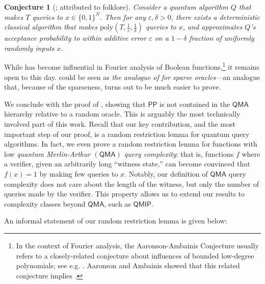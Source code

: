 \documentclass[10pt,a4paper]{article}
\newtheorem{conjecture}[theorem]{Conjecture}
\newcommand{\eps}{\varepsilon}
\newcommand{\poly}{\mathrm{poly}}
\begin{document}
\begin{conjecture}[{\cite[Conjecture 1.5]{AA14}; attributed to folklore}]
\label{conj:aaronson_ambainis}
Consider a quantum algorithm $Q$ that makes $T$ queries to $x \in \{0,1\}^N$. Then for any $\eps, \delta > 0$, there exists a deterministic classical algorithm that makes $\poly\left(T, \frac{1}{\eps}, \frac{1}{\delta}\right)$ queries to $x$, and approximates $Q$'s acceptance probability to within additive error $\eps$ on a $1 - \delta$ fraction of uniformly randomly inputs $x$.
\end{conjecture}

While  has become influential in Fourier analysis of Boolean functions,\footnote{In the context of Fourier analysis, the Aaronson-Ambainis Conjecture usually refers to a closely-related conjecture about influences of bounded low-degree polynomials; see e.g. \cite{Mon12,OZ16}. Aaronson and Ambainis \cite{AA14} showed that this related conjecture implies .} it remains open to this day.  could be seen as \textit{the analogue of  for sparse oracles}---an analogue that, because of the sparseness, turns out to be much easier to prove.

\bigskip

We conclude with the proof of , showing that $\mathsf{PP}$ is not contained in the $\mathsf{QMA}$ hierarchy relative to a random oracle. This is arguably the most technically involved part of this work. Recall that our key contribution, and the most important step of our proof, is a random restriction lemma for quantum query algorithms. In fact, we even prove a random restriction lemma for functions with low \emph{quantum Merlin-Arthur $(\mathsf{QMA})$ query complexity}: that is, functions $f$ where a verifier, given an arbitrarily long ``witness state,'' can become convinced that $f(x) = 1$ by making few queries to $x$. Notably, our definition of $\mathsf{QMA}$ query complexity does not care about the length of the witness, but only the number of queries made by the verifier. This property allows us to extend our results to complexity classes beyond $\mathsf{QMA}$, such as $\mathsf{QMIP}$.

An informal statement of our random restriction lemma is given below:
\end{document}
